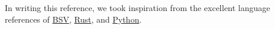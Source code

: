 In writing this reference, we took inspiration from the excellent language references
of \href{TODO}{BSV}, \href{TODO}{Rust}, and \href{TODO}{Python}.

